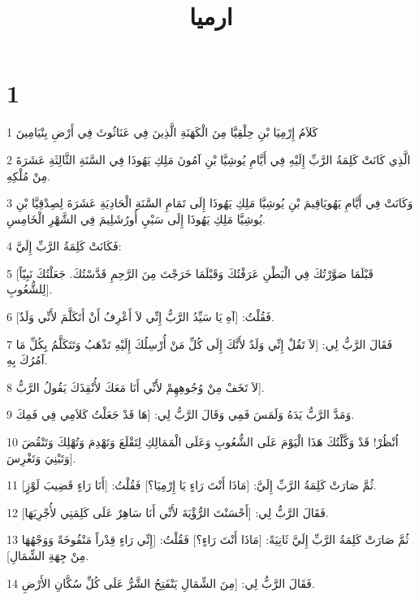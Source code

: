 

\title{ارميا}


\chapter{1}

\par 1 كَلاَمُ إِرْمِيَا بْنِ حِلْقِيَّا مِنَ الْكَهَنَةِ الَّذِينَ فِي عَنَاثُوثَ فِي أَرْضِ بِنْيَامِينَ
\par 2 الَّذِي كَانَتْ كَلِمَةُ الرَّبِّ إِلَيْهِ فِي أَيَّامِ يُوشِيَّا بْنِ آمُونَ مَلِكِ يَهُوذَا فِي السَّنَةِ الثَّالِثَةِ عَشَرَةَ مِنْ مُلْكِهِ.
\par 3 وَكَانَتْ فِي أَيَّامِ يَهُويَاقِيمَ بْنِ يُوشِيَّا مَلِكِ يَهُوذَا إِلَى تَمَامِ السَّنَةِ الْحَادِيَةِ عَشَرَةَ لِصِدْقِيَّا بْنِ يُوشِيَّا مَلِكِ يَهُوذَا إِلَى سَبْيِ أُورُشَلِيمَ فِي الشَّهْرِ الْخَامِسِ.
\par 4 فَكَانَتْ كَلِمَةُ الرَّبِّ إِلَيَّ:
\par 5 [قَبْلَمَا صَوَّرْتُكَ فِي الْبَطْنِ عَرَفْتُكَ وَقَبْلَمَا خَرَجْتَ مِنَ الرَّحِمِ قَدَّسْتُكَ. جَعَلْتُكَ نَبِيّاً لِلشُّعُوبِ].
\par 6 فَقُلْتُ: [آهِ يَا سَيِّدُ الرَّبُّ إِنِّي لاَ أَعْرِفُ أَنْ أَتَكَلَّمَ لأَنِّي وَلَدٌ].
\par 7 فَقَالَ الرَّبُّ لِي: [لاَ تَقُلْ إِنِّي وَلَدٌ لأَنَّكَ إِلَى كُلِّ مَنْ أُرْسِلُكَ إِلَيْهِ تَذْهَبُ وَتَتَكَلَّمُ بِكُلِّ مَا آمُرُكَ بِهِ.
\par 8 لاَ تَخَفْ مِنْ وُجُوهِهِمْ لأَنِّي أَنَا مَعَكَ لأُنْقِذَكَ يَقُولُ الرَّبُّ].
\par 9 وَمَدَّ الرَّبُّ يَدَهُ وَلَمَسَ فَمِي وَقَالَ الرَّبُّ لِي: [هَا قَدْ جَعَلْتُ كَلاَمِي فِي فَمِكَ.
\par 10 اُنْظُرْ! قَدْ وَكَّلْتُكَ هَذَا الْيَوْمَ عَلَى الشُّعُوبِ وَعَلَى الْمَمَالِكِ لِتَقْلَعَ وَتَهْدِمَ وَتُهْلِكَ وَتَنْقُضَ وَتَبْنِيَ وَتَغْرِسَ].
\par 11 ثُمَّ صَارَتْ كَلِمَةُ الرَّبِّ إِلَيَّ: [مَاذَا أَنْتَ رَاءٍ يَا إِرْمِيَا؟] فَقُلْتُ: [أَنَا رَاءٍ قَضِيبَ لَوْزٍ].
\par 12 فَقَالَ الرَّبُّ لِي: [أَحْسَنْتَ الرُّؤْيَةَ لأَنِّي أَنَا سَاهِرٌ عَلَى كَلِمَتِي لأُجْرِيَهَا].
\par 13 ثُمَّ صَارَتْ كَلِمَةُ الرَّبِّ إِلَيَّ ثَانِيَةً: [مَاذَا أَنْتَ رَاءٍ؟] فَقُلْتُ: [إِنِّي رَاءٍ قِدْراً مَنْفُوخَةً وَوَجْهُهَا مِنْ جِهَةِ الشِّمَالِ].
\par 14 فَقَالَ الرَّبُّ لِي: [مِنَ الشِّمَالِ يَنْفَتِحُ الشَّرُّ عَلَى كُلِّ سُكَّانِ الأَرْضِ.
